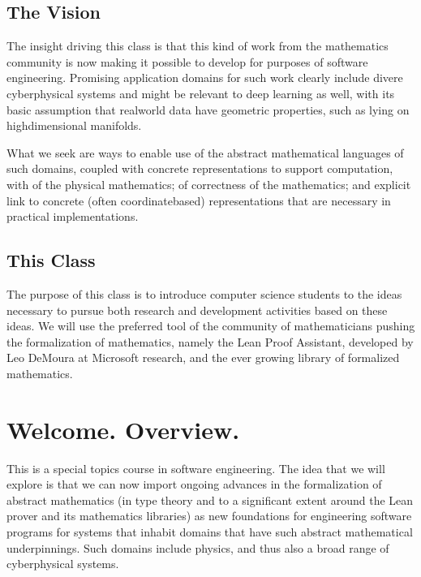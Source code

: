 \documentclass[letterpaper,10pt,english]{sphinxmanual}
\begin{document}
\subsection{The Vision}
\label{\detokenize{A_00_Introduction:the-vision}}
\sphinxAtStartPar
The insight driving this class is that this kind of work
from the  mathematics community is now making it possible
to develop  for purposes
of software engineering. Promising application domains for
such work clearly include divere cyber\sphinxhyphen{}physical systems and
might be relevant to deep learning as well, with its basic
assumption that real\sphinxhyphen{}world data have geometric properties,
such as lying on high\sphinxhyphen{}dimensional manifolds.

\sphinxAtStartPar
What we seek are ways to enable use of the abstract mathematical
languages of such domains, coupled with concrete representations
to support computation, with  of the
physical mathematics;  of correctness of the
mathematics; and explicit link to concrete (often coordinate\sphinxhyphen{}based)
representations that are necessary in practical implementations.


\subsection{This Class}
\label{\detokenize{A_00_Introduction:this-class}}
\sphinxAtStartPar
The purpose of this class is to introduce computer science
students to the ideas necessary to pursue both research and
development activities based on these ideas. We will use the
preferred tool of the community of mathematicians pushing the
formalization of mathematics, namely the Lean Proof Assistant,
developed by Leo DeMoura at Microsoft research, and the ever
growing  library of formalized mathematics.


\section{Welcome. Overview.}
\label{\detokenize{A_00_Introduction:welcome-overview}}
\sphinxAtStartPar
This is a special topics course in software engineering. The idea
that we will explore is that we can now import ongoing advances
in the formalization of abstract mathematics (in type theory and
to a significant extent around the Lean prover and its mathematics
libraries) as new foundations for engineering software programs for
systems that inhabit domains that have such abstract mathematical
underpinnings. Such domains include physics, and thus also a broad
range of cyber\sphinxhyphen{}physical systems.
\end{document}
